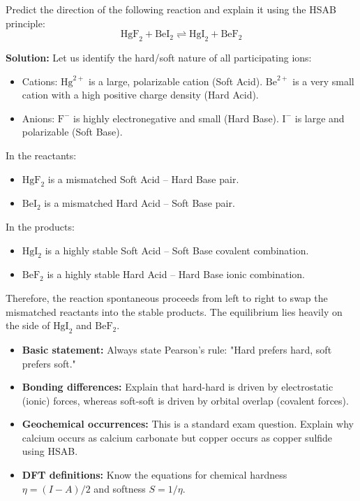 \documentclass[12pt,a4paper]{article}
\begin{document}
\begin{tcolorbox}[examplebox, title={Example 7.1: Reactivity Prediction}]
  Predict the direction of the following reaction and explain it using the HSAB principle:
  \[ \text{HgF}_2 + \text{BeI}_2 \rightleftharpoons \text{HgI}_2 + \text{BeF}_2 \]
  \par\vspace{4pt}
  \textbf{Solution:}
  Let us identify the hard/soft nature of all participating ions:
  \begin{itemize}[leftmargin=1cm, itemsep=1pt]
    \item Cations: $\text{Hg}^{2+}$ is a large, polarizable cation (Soft Acid). $\text{Be}^{2+}$ is a very small cation with a high positive charge density (Hard Acid).
    \item Anions: $\text{F}^-$ is highly electronegative and small (Hard Base). $\text{I}^-$ is large and polarizable (Soft Base).
  \end{itemize}
  In the reactants:
  \begin{itemize}[leftmargin=1cm, itemsep=1pt]
    \item $\text{HgF}_2$ is a mismatched Soft Acid -- Hard Base pair.
    \item $\text{BeI}_2$ is a mismatched Hard Acid -- Soft Base pair.
  \end{itemize}
  In the products:
  \begin{itemize}[leftmargin=1cm, itemsep=1pt]
    \item $\text{HgI}_2$ is a highly stable Soft Acid -- Soft Base covalent combination.
    \item $\text{BeF}_2$ is a highly stable Hard Acid -- Hard Base ionic combination.
  \end{itemize}
  Therefore, the reaction spontaneous proceeds from left to right to swap the mismatched reactants into the stable products. The equilibrium lies heavily on the side of $\text{HgI}_2$ and $\text{BeF}_2$.
\end{tcolorbox}

\begin{tcolorbox}[exambox, title={Exam Points: HSAB Principle}]
  \begin{itemize}[leftmargin=*, itemsep=2pt, topsep=2pt]
    \item \textbf{Basic statement:} Always state Pearson's rule: "Hard prefers hard, soft prefers soft."
    \item \textbf{Bonding differences:} Explain that hard-hard is driven by electrostatic (ionic) forces, whereas soft-soft is driven by orbital overlap (covalent forces).
    \item \textbf{Geochemical occurrences:} This is a standard exam question. Explain why calcium occurs as calcium carbonate but copper occurs as copper sulfide using HSAB.
    \item \textbf{DFT definitions:} Know the equations for chemical hardness $\eta = (I-A)/2$ and softness $S = 1/\eta$.
  \end{itemize}
\end{tcolorbox}
\end{document}
